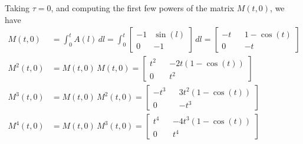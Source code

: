 Taking \( \tau = 0 \), and computing the first few powers of the matrix \( M(t, 0) \), we have
\begin{align*}
    M(t, 0)
     & =
    \int_{0}^{t} A(l) \, dl
    =
    \int_{0}^{t}
    \begin{bmatrix}
        -1 & \sin(l) \\
        0  & -1
    \end{bmatrix}
    \, dl
    =
    \begin{bmatrix}
        -t &  & 1 - \cos(t) \\
        0  &  & -t
    \end{bmatrix}
    \\
    M^2(t, 0)
     & =
    M(t, 0) \,
    M(t, 0)
    =
    \begin{bmatrix}
        t^2 &  & -2t(1 - \cos(t)) \\
        0   &  & t^2
    \end{bmatrix}
    \\
    M^3(t, 0)
     & =
    M(t, 0) \,
    M^2(t, 0)
    =
    \begin{bmatrix}
        -t^3 &  & 3t^2(1 - \cos(t)) \\
        0    &  & -t^3
    \end{bmatrix}
    \\
    M^4(t, 0)
     & =
    M(t, 0) \,
    M^3(t, 0)
    =
    \begin{bmatrix}
        t^4 &  & -4t^3(1 - \cos(t)) \\
        0   &  & t^4
    \end{bmatrix}
\end{align*}

